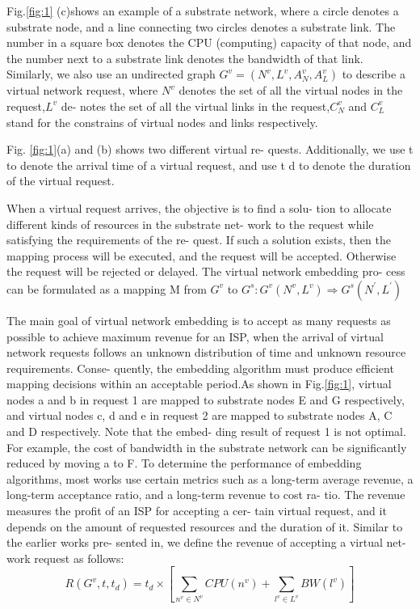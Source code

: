\documentclass[12pt]{article}
\begin{document}
Fig.\ref{fig:1} (c)shows an example
of a substrate network, where a circle denotes a substrate node,
and a line connecting two circles denotes a substrate link. The
number in a square box denotes the CPU (computing) capacity of
that node, and the number next to a substrate link denotes the
bandwidth of that link. Similarly, we also use an undirected graph
$G^v = (N^v, L^v, A_N^v, A_L^v)$  to describe a virtual network request, where
$N^v$ denotes the set of all the virtual nodes in the request,$L^v$ de-
notes the set of all the virtual links in the request,$C_N^v$ and $C_L^v$ stand
for the constrains of virtual nodes and links respectively.

Fig. \ref{fig:1}(a) and (b) shows two different virtual re-
quests. Additionally, we use t to denote the arrival time of a virtual
request, and use t d to denote the duration of the virtual request.

When a virtual request arrives, the objective is to find a solu-
tion to allocate different kinds of resources in the substrate net-
work to the request while satisfying the requirements of the re-
quest. If such a solution exists, then the mapping process will be
executed, and the request will be accepted. Otherwise the request
will be rejected or delayed. The virtual network embedding pro-
cess can be formulated as a mapping M from $G^v$ to $G^s: G^v(N^v, L^v) \Rightarrow G^s(N^\prime, L^\prime)$

The main goal of virtual network embedding is to accept as
many requests as possible to achieve maximum revenue for an ISP,
when the arrival of virtual network requests follows an unknown
distribution of time and unknown resource requirements. Conse-
quently, the embedding algorithm must produce efficient mapping
decisions within an acceptable period.As shown in Fig.\ref{fig:1}, virtual
nodes a and b in request 1 are mapped to substrate nodes E and G
respectively, and virtual nodes c, d and e in request 2 are mapped
to substrate nodes A, C and D respectively. Note that the embed-
ding result of request 1 is not optimal. For example, the cost of
bandwidth in the substrate network can be significantly reduced
by moving a to F.
To determine the performance of embedding algorithms, most
works use certain metrics such as a long-term average revenue, a
long-term acceptance ratio, and a long-term revenue to cost ra-
tio. The revenue measures the profit of an ISP for accepting a cer-
tain virtual request, and it depends on the amount of requested
resources and the duration of it. Similar to the earlier works pre-
sented in, we define the revenue of accepting a virtual net-
work request as follows:
\begin{equation}
R(G^v, t, t_d) = t_d \times [\sum_{n^v \in N^v} CPU(n^v) + \sum_{l^v \in L^v} BW(l^v)]
\end{equation}
\end{document}
